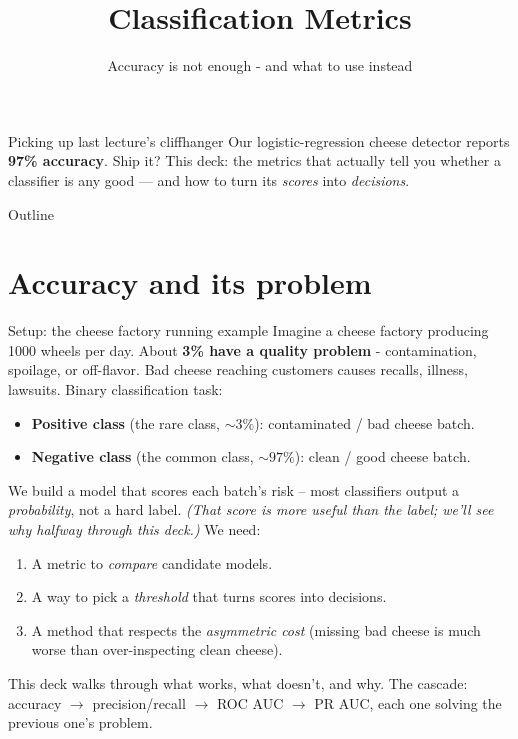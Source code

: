 \documentclass[aspectratio=169]{beamer}
\title{Classification Metrics}
\subtitle{Accuracy is not enough - and what to use instead}
\date{}
\begin{document}
\begin{frame}{Picking up last lecture's cliffhanger}
  Our logistic-regression cheese detector reports \textbf{97\% accuracy}. Ship it?
  \vfill
  \vfill
  This deck: the metrics that actually tell you whether a classifier is any good --- and
  how to turn its \emph{scores} into \emph{decisions}.
\end{frame}

\begin{frame}{Outline}
  \tableofcontents
\end{frame}

\section{Accuracy and its problem}

\begin{frame}{Setup: the cheese factory running example}
  Imagine a cheese factory producing 1000 wheels per day. About \textbf{3\% have a quality problem} - contamination, spoilage, or off-flavor. Bad cheese reaching customers causes recalls, illness, lawsuits.
  \vfill
  Binary classification task:
  \begin{itemize}
    \item \textbf{Positive class} (the rare class, $\sim 3\%$): contaminated / bad cheese batch.
    \item \textbf{Negative class} (the common class, $\sim 97\%$): clean / good cheese batch.
  \end{itemize}
  \vfill
  We build a model that scores each batch's risk -- most classifiers output a \emph{probability}, not a hard label. \emph{(That score is more useful than the label; we'll see why halfway through this deck.)} We need:
  \begin{enumerate}\small
    \item A metric to \emph{compare} candidate models.
    \item A way to pick a \emph{threshold} that turns scores into decisions.
    \item A method that respects the \emph{asymmetric cost} (missing bad cheese is much worse than over-inspecting clean cheese).
  \end{enumerate}
  \vfill
  This deck walks through what works, what doesn't, and why. The cascade: accuracy $\to$ precision/recall $\to$ ROC AUC $\to$ PR AUC, each one solving the previous one's problem.
\end{frame}
\end{document}
